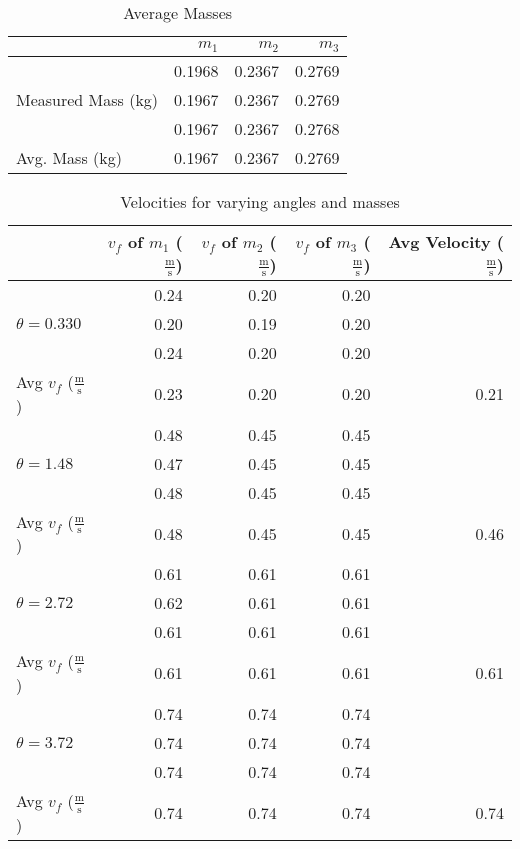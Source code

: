\documentclass [12pt, letterpaper, twoside] {article}
\begin{document}
\begin {table}[h]
  \centering
  \begin {tabular}{| l | r | r | r |}
    \hline\hline
    & \(m_{1}\) & \(m_{2}\) & \(m_{3}\) \\
    \hline
    & 0.1968 & 0.2367 & 0.2769 \\
    Measured Mass (kg) & 0.1967 & 0.2367 & 0.2769 \\
    & 0.1967 & 0.2367 & 0.2768 \\
    \hline
    Avg. Mass (kg) & 0.1967 & 0.2367 & 0.2769 \\ %
    \hline\hline
  \end {tabular}
  \caption {Average Masses}
\end {table}

\begin {table}[h]
  \centering
  \begin {tabular}{| l | r | r | r | r |}
    \hline\hline
    & \(v_{f}\) of \(m_{1}\) (\(\tfrac{\text{m}}{\text{s}}\)) & \(v_{f}\) of \(m_{2}\) (\(\tfrac{\text{m}}{\text{s}}\)) & \(v_{f}\) of \(m_{3}\) (\(\tfrac{\text{m}}{\text{s}}\)) & Avg Velocity (\(\tfrac{\text{m}}{\text{s}}\)) \\
    \hline
    \multirow {3}{*}{\(\theta=0.330\)} & 0.24 & 0.20 & 0.20 & \\
    & 0.20 & 0.19 & 0.20 & \\
    & 0.24 & 0.20 & 0.20 & \\
    \hline
    Avg \(v_{f}\) (\(\tfrac{\text{m}}{\text{s}}\)) & 0.23 & 0.20 & 0.20 & 0.21 \\ %
    \hline
    \multirow {3}{*}{\(\theta=1.48\)} & 0.48 & 0.45 & 0.45 & \\
    & 0.47 & 0.45 & 0.45 & \\
    & 0.48 & 0.45 & 0.45 & \\
    \hline
    Avg \(v_{f}\) (\(\tfrac{\text{m}}{\text{s}}\)) & 0.48 & 0.45 & 0.45 & 0.46 \\ %
    \hline
    \multirow {3}{*}{\(\theta=2.72\)} & 0.61 & 0.61 & 0.61 & \\
    & 0.62 & 0.61 & 0.61 & \\
    & 0.61 & 0.61 & 0.61 & \\
    \hline
    Avg \(v_{f}\) (\(\tfrac{\text{m}}{\text{s}}\)) & 0.61 & 0.61 & 0.61 & 0.61 \\ %
    \hline
    \multirow {3}{*}{\(\theta=3.72\)} & 0.74 & 0.74 & 0.74 & \\
    & 0.74 & 0.74 & 0.74 & \\
    & 0.74 & 0.74 & 0.74 & \\
    \hline
    Avg \(v_{f}\) (\(\tfrac{\text{m}}{\text{s}}\)) & 0.74 & 0.74 & 0.74 & 0.74 \\
    \hline\hline
  \end {tabular}
  \caption {Velocities for varying angles and masses}
\end {table}
\end{document}
